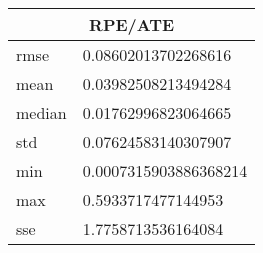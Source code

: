 \begin{table}[!ht] 
 \centering 
 \begin{tabular}{|l|l|} \hline 
 \multicolumn{2}{|c|}{RPE/ATE} \\ \hline 
 rmse & 0.08602013702268616 \\ \hline 
mean & 0.03982508213494284 \\ \hline 
median & 0.01762996823064665 \\ \hline 
std & 0.07624583140307907 \\ \hline 
min & 0.0007315903886368214 \\ \hline 
max & 0.5933717477144953 \\ \hline 
sse & 1.7758713536164084 \\ \hline 
\end{tabular} 
 \end{table}